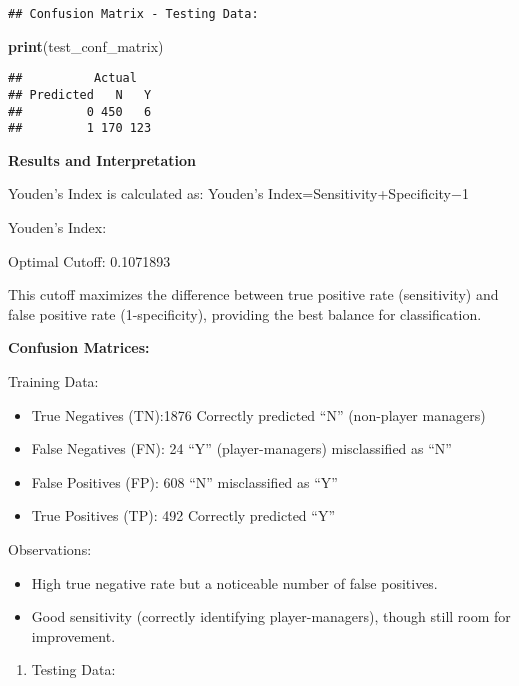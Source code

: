 \documentclass[
]{article}
\newenvironment{Shaded}{\begin{snugshade}}{\end{snugshade}}
\newcommand{\FunctionTok}[1]{\textcolor[rgb]{0.13,0.29,0.53}{\textbf{#1}}}
\newcommand{\NormalTok}[1]{#1}
\providecommand{\tightlist}{%
  \setlength{\itemsep}{0pt}\setlength{\parskip}{0pt}}
\begin{document}
\begin{verbatim}
## Confusion Matrix - Testing Data:
\end{verbatim}

\begin{Shaded}
\begin{Highlighting}[]
\FunctionTok{print}\NormalTok{(test\_conf\_matrix)}
\end{Highlighting}
\end{Shaded}

\begin{verbatim}
##          Actual
## Predicted   N   Y
##         0 450   6
##         1 170 123
\end{verbatim}

\textbf{Results and Interpretation}

Youden's Index is calculated as: Youden's
Index=Sensitivity+Specificity−1

Youden's Index:

Optimal Cutoff: 0.1071893

This cutoff maximizes the difference between true positive rate
(sensitivity) and false positive rate (1-specificity), providing the
best balance for classification.

\textbf{Confusion Matrices:}

Training Data:

\begin{itemize}
\item
  True Negatives (TN):1876 Correctly predicted ``N'' (non-player
  managers)
\item
  False Negatives (FN): 24 ``Y'' (player-managers) misclassified as
  ``N''
\item
  False Positives (FP): 608 ``N'' misclassified as ``Y''
\item
  True Positives (TP): 492 Correctly predicted ``Y''
\end{itemize}

Observations:

\begin{itemize}
\item
  High true negative rate but a noticeable number of false positives.
\item
  Good sensitivity (correctly identifying player-managers), though still
  room for improvement.
\end{itemize}

\begin{enumerate}
\def\labelenumi{\arabic{enumi}.}
\setcounter{enumi}{1}
\tightlist
\item
  Testing Data:
\end{enumerate}
\end{document}
